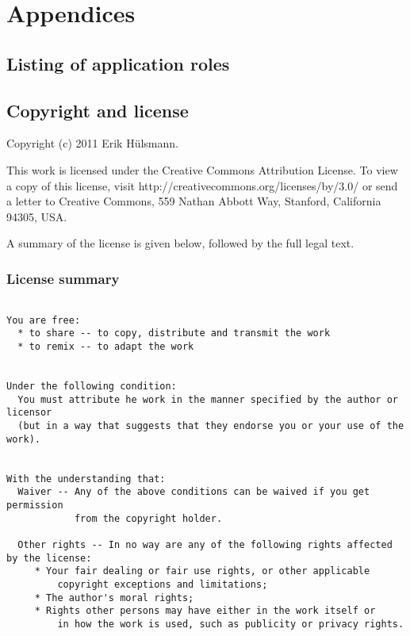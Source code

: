 


\part{Appendices}
\appendix

\chapter{Listing of application roles}

\chapter{Copyright and license}

Copyright (c) 2011 Erik H\"ulsmann.


This work is licensed under the Creative Commons Attribution License.
To view a copy of this license, visit http://creativecommons.org/licenses/by/3.0/
or send a letter to Creative Commons, 559 Nathan Abbott Way,
Stanford, California 94305, USA.

A summary of the license is given below, followed by the full legal text.

\section{License summary}

\begin{verbatim}

You are free:
  * to share -- to copy, distribute and transmit the work
  * to remix -- to adapt the work


Under the following condition:
  You must attribute he work in the manner specified by the author or licensor
  (but in a way that suggests that they endorse you or your use of the work).


With the understanding that:
  Waiver -- Any of the above conditions can be waived if you get permission
            from the copyright holder.
  
  Other rights -- In no way are any of the following rights affected by the license:
     * Your fair dealing or fair use rights, or other applicable 
         copyright exceptions and limitations;
     * The author's moral rights;
     * Rights other persons may have either in the work itself or
         in how the work is used, such as publicity or privacy rights.



\end{verbatim}



